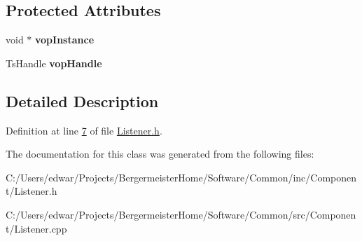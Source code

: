\subsection*{Protected Attributes}
\begin{DoxyCompactItemize}
\item 
\mbox{\label{class_g_n_common_1_1_n_component_1_1_g_tc_listener_ad2f8b2b212ee0120ce41c8715abe68aa}} 
void $\ast$ {\bfseries vop\+Instance}
\item 
\mbox{\label{class_g_n_common_1_1_n_component_1_1_g_tc_listener_a0add5b70f2f2f400de4ab6442fe91595}} 
Ts\+Handle {\bfseries vop\+Handle}
\end{DoxyCompactItemize}


\subsection{Detailed Description}


Definition at line \mbox{\hyperlink{_listener_8h_source_l00007}{7}} of file \mbox{\hyperlink{_listener_8h_source}{Listener.\+h}}.



The documentation for this class was generated from the following files\+:\begin{DoxyCompactItemize}
\item 
C\+:/\+Users/edwar/\+Projects/\+Bergermeister\+Home/\+Software/\+Common/inc/\+Component/Listener.\+h\item 
C\+:/\+Users/edwar/\+Projects/\+Bergermeister\+Home/\+Software/\+Common/src/\+Component/Listener.\+cpp\end{DoxyCompactItemize}
